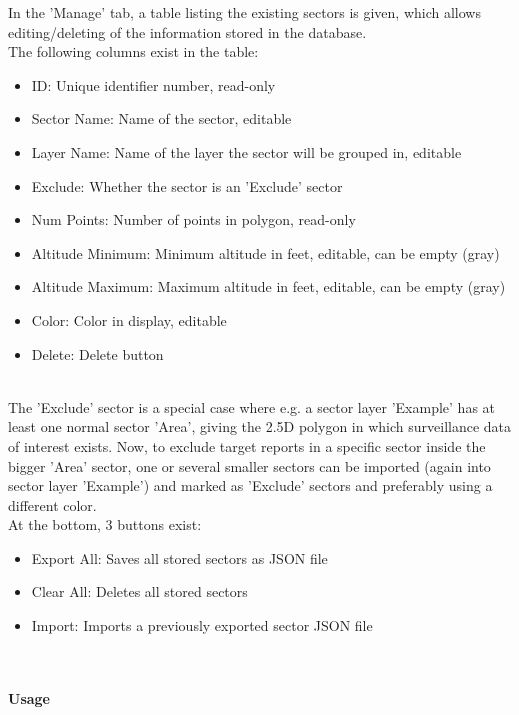 In the 'Manage' tab, a table listing the existing sectors is given, which allows editing/deleting of the information stored in the database. \\

The following columns exist in the table:
\begin{itemize}
\item ID: Unique identifier number, read-only
\item Sector Name: Name of the sector, editable
\item Layer Name: Name of the layer the sector will be grouped in, editable
\item Exclude: Whether the sector is an 'Exclude' sector
\item Num Points: Number of points in polygon, read-only
\item Altitude Minimum: Minimum altitude in feet, editable, can be empty (gray)
\item Altitude Maximum: Maximum altitude in feet, editable, can be empty (gray)
\item Color: Color in display, editable
\item Delete: Delete button
\end{itemize}
\ \\

The 'Exclude' sector is a special case where e.g. a sector layer 'Example' has at least one normal sector 'Area', giving the 2.5D polygon in which surveillance data of interest exists. 
Now, to exclude target reports in a specific sector inside the bigger 'Area' sector, 
one or several smaller sectors can be imported (again into sector layer 'Example') and marked as 'Exclude' sectors and preferably using a different color. \\

At the bottom, 3 buttons exist:

\begin{itemize}
\item Export All: Saves all stored sectors as JSON file
\item Clear All: Deletes all stored sectors
\item Import: Imports a previously exported sector JSON file
\end{itemize}
\ \\

\paragraph {Usage}


